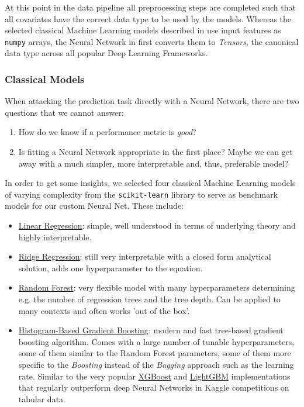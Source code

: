 At this point in the data pipeline all preprocessing steps are completed such that all covariates have the correct data type to be used by the models.
Whereas the selected classical Machine Learning models described in  use input features as \texttt{numpy} arrays, the Neural Network in  first converts them to \emph{Tensors}, the canonical data type across all popular Deep Learning Frameworks.

\subsubsection{Classical Models} \label{classical-models}

When attacking the prediction task directly with a Neural Network, there are two questions that we cannot answer:
\begin{enumerate}
  \item How do we know if a performance metric is \emph{good}?
  \item Is fitting a Neural Network appropriate in the first place?
        Maybe we can get away with a much simpler, more interpretable and, thus, preferable model?
\end{enumerate}
In order to get some insights, we selected four classical Machine Learning models of varying complexity from the \texttt{scikit-learn} library \citep{pedregosa2011} to serve as benchmark models for our custom Neural Net.
These include:
\begin{itemize}
  \item \href{https://scikit-learn.org/stable/modules/generated/sklearn.linear_model.LinearRegression.html}{Linear Regression}: simple, well understood in terms of underlying theory and highly interpretable.
  \item \href{https://scikit-learn.org/stable/modules/generated/sklearn.linear_model.Ridge.html}{Ridge Regression}: still very interpretable with a closed form analytical solution, adds one hyperparameter to the equation.
  \item \href{https://scikit-learn.org/stable/modules/generated/sklearn.ensemble.RandomForestRegressor.html}{Random Forest}: very flexible model with many hyperparameters determining e.g. the number of regression trees and the tree depth.
        Can be applied to many contexts and often works 'out of the box'.
  \item \href{https://scikit-learn.org/stable/modules/generated/sklearn.ensemble.HistGradientBoostingRegressor.html}{Histogram-Based Gradient Boosting}: modern and fast tree-based gradient boosting algorithm.
        Comes with a large number of tunable hyperparameters, some of them similar to the Random Forest parameters, some of them more specific to the \emph{Boosting} instead of the \emph{Bagging} approach such as the learning rate.
        Similar to the very popular \href{https://xgboost.readthedocs.io/en/stable/}{XGBoost} \citep{chen2016} and \href{https://lightgbm.readthedocs.io/en/latest/}{LightGBM} \citep{ke2017} implementations that regularly outperform deep Neural Networks in Kaggle competitions on tabular data.
\end{itemize}

